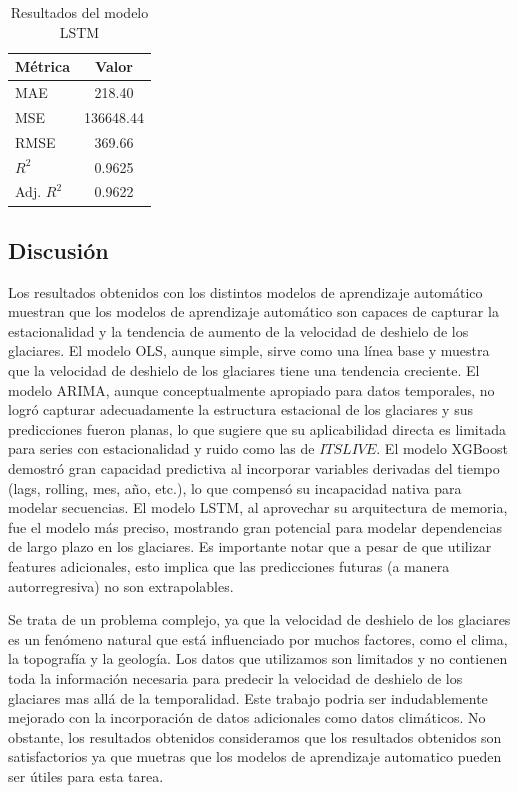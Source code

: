 \documentclass[sigconf,authordraft,language=spanish]{acmart}
\begin{document}
\begin{table}[H]
  \caption{Resultados del modelo LSTM}
  \label{tab:lstm}
  \begin{tabular}{lc}
    \toprule
    Métrica & Valor \\
    \midrule
    MAE & 218.40 \\
    MSE & 136648.44 \\
    RMSE & 369.66 \\
    $R^2$ & 0.9625 \\
    Adj. $R^2$ & 0.9622 \\
    \bottomrule
  \end{tabular}
\end{table}

\subsection{Discusión}

Los resultados obtenidos con los distintos modelos de aprendizaje automático muestran que los modelos de aprendizaje automático son capaces de capturar la estacionalidad y la tendencia de aumento de la velocidad de deshielo de los glaciares.
El modelo OLS, aunque simple, sirve como una línea base y muestra que la velocidad de deshielo de los glaciares tiene una tendencia creciente.
El modelo ARIMA, aunque conceptualmente apropiado para datos temporales, no logró capturar adecuadamente la estructura estacional de los glaciares y sus predicciones fueron planas, lo que sugiere que su aplicabilidad directa es limitada para series con estacionalidad y ruido como las de $ITSLIVE$.
El modelo XGBoost demostró gran capacidad predictiva al incorporar variables derivadas del tiempo (lags, rolling, mes, año, etc.), lo que compensó su incapacidad nativa para modelar secuencias.
El modelo LSTM, al aprovechar su arquitectura de memoria, fue el modelo más preciso, mostrando gran potencial para modelar dependencias de largo plazo en los glaciares.
Es importante notar que a pesar de que utilizar features adicionales, esto implica que las predicciones futuras (a manera autorregresiva) no son extrapolables.

Se trata de un problema complejo, ya que la velocidad de deshielo de los glaciares es un fenómeno natural que está influenciado por muchos factores, como el clima, la topografía y la geología.
Los datos que utilizamos son limitados y no contienen toda la información necesaria para predecir la velocidad de deshielo de los glaciares mas allá de la temporalidad.
Este trabajo podria ser indudablemente mejorado con la incorporación de datos adicionales como datos climáticos. 
No obstante, los resultados obtenidos consideramos que los resultados obtenidos son satisfactorios ya que muetras que los modelos de aprendizaje automatico pueden ser útiles para esta tarea.
\end{document}

